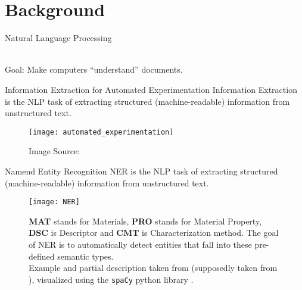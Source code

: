 \section{Background}

\begin{frame}[c]{Natural Language Processing}
    \large
    \centering
     \\
    Goal: Make computers ``understand'' documents.
\end{frame}


\begin{frame}[c]{Information Extraction for Automated Experimentation}
    Information Extraction is the \gls{NLP} task of extracting structured (machine-readable) information from unstructured text.
    \begin{figure}
    \texttt{[image: automated\_experimentation]}
    \caption{
    Image Source: \cite{shi_automated_2021}
    }
    \end{figure}
\end{frame}

\begin{frame}[c]{Namend Entity Recognition}
    \gls{NER} is the \gls{NLP} task of extracting structured (machine-readable) information from unstructured text.
    \begin{figure}
    \texttt{[image: NER]}
    \caption{
        \textbf{MAT} stands for Materials,
        \textbf{PRO} stands for Material Property,
        \textbf{DSC} is Descriptor and
        \textbf{CMT} is Characterization method.
        The goal of \gls{NER} is to automatically detect entities that fall into these pre-defined semantic types. \\
        Example and partial description taken from \cite{zhao_finetuning_2021} (supposedly taken from \cite{weston_named_2019}), visualized using the \texttt{spaCy} python library \cite{montaniispacy_natural_2017}.
    }
    \end{figure}
\end{frame}



